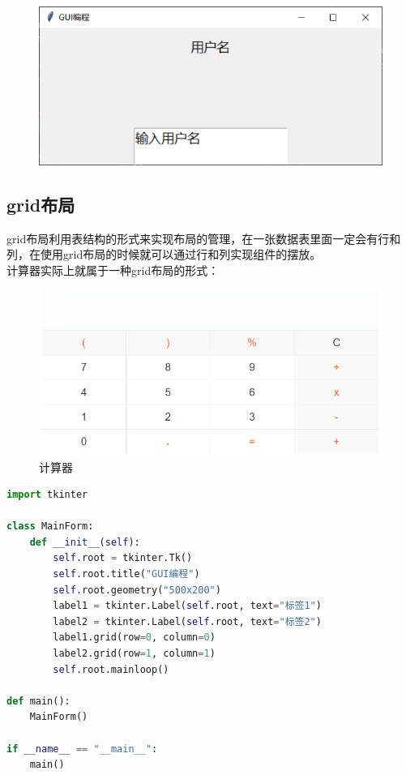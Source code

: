 \begin{tcolorbox}
	\begin{figure}[H]
		\centering
		\includegraphics[]{img/C13/13-3/1.png}
	\end{figure}
\end{tcolorbox}

\vspace{0.5cm}

\subsection{grid布局}

grid布局利用表结构的形式来实现布局的管理，在一张数据表里面一定会有行和列，在使用grid布局的时候就可以通过行和列实现组件的摆放。\\

计算器实际上就属于一种grid布局的形式：

\begin{figure}[H]
	\centering
	\includegraphics[]{img/C13/13-3/2.png}
	\caption{计算器}
\end{figure}

\vspace{0.5cm}


\begin{lstlisting}[language=Python]
import tkinter

class MainForm:
    def __init__(self):
        self.root = tkinter.Tk()
        self.root.title("GUI编程")
        self.root.geometry("500x200")
        label1 = tkinter.Label(self.root, text="标签1")
        label2 = tkinter.Label(self.root, text="标签2")
        label1.grid(row=0, column=0)
        label2.grid(row=1, column=1)
        self.root.mainloop()

def main():
    MainForm()

if __name__ == "__main__":
    main()
\end{lstlisting}

